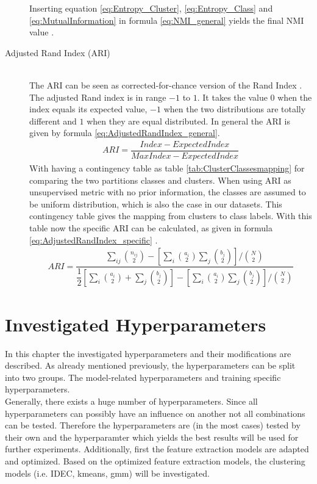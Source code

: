 \documentclass[12pt,DIV14,BCOR12mm,a4paper,footexclude,headinclude,halfparskip-,twoside,openright,cleardoubleempty,idxtotoc,bibtotoc,listtotoc]{scrreprt} %
\numberwithin{equation}{chapter}
\begin{document}
\begin{description}
	Inserting equation \ref{eq:Entropy_Cluster}, \ref{eq:Entropy_Class} and \ref{eq:MutualInformation} in formula \ref{eq:NMI_general} yields the final NMI value \cite{Vinh10NMI}.
	\item[Adjusted Rand Index (ARI)]\hfill \\
	The ARI can be seen as corrected-for-chance version of the Rand Index \cite{Rand71RandIndex}. The adjusted Rand index is in range $-1$ to $1$. It takes the value $0$ when the index equals its expected value, $-1$ when the two distributions are totally different and $1$ when they are equal distributed. In general the ARI is given by formula \ref{eq:AdjustedRandIndex_general}.
	\begin{align}
		ARI = \dfrac{Index - ExpectedIndex}{MaxIndex - ExpectedIndex}\label{eq:AdjustedRandIndex_general}
	\end{align}
	With having a contingency table as table \ref{tab:ClusterClassesmapping} for comparing the two partitions classes and clusters. When using ARI as unsupervised metric with no prior information, the classes are assumed to be uniform distribution, which is also the case in our datasets. This contingency table gives the mapping from clusters to class labels. With this table now the specific ARI can be calculated, as given in formula \ref{eq:AdjustedRandIndex_specific} \cite{Yeung01ARI}.
	\begin{align}
		ARI = \dfrac{\sum_{ij}\binom{n_{ij}}{2}-[\sum_i\binom{a_i}{2}\sum_j\binom{b_j}{2}]/\binom{N}{2}}{\dfrac{1}{2}[\sum_i\binom{a_i}{2}+\sum_j\binom{b_j}{2}]-[\sum_i\binom{a_i}{2}\sum_j\binom{b_j}{2}]/\binom{N}{2}}\label{eq:AdjustedRandIndex_specific}
	\end{align}
\end{description} 
\section{Investigated Hyperparameters}
In this chapter the investigated hyperparameters and their modifications are described. As already mentioned previously, the hyperparameters can be split into two groups. The model-related hyperparameters and training specific hyperparameters.\\
Generally, there exists a huge number of hyperparameters. Since all hyperparameters can possibly have an influence on another not all combinations can be tested. Therefore the hyperparameters are (in the most cases) tested by their own and the hyperparamter which yields the best results will be used for further experiments. Additionally, first the feature extraction models are adapted and optimized. Based on the optimized feature extraction models, the clustering models (i.e. IDEC, kmeans, gmm) will be investigated.
\end{document}
